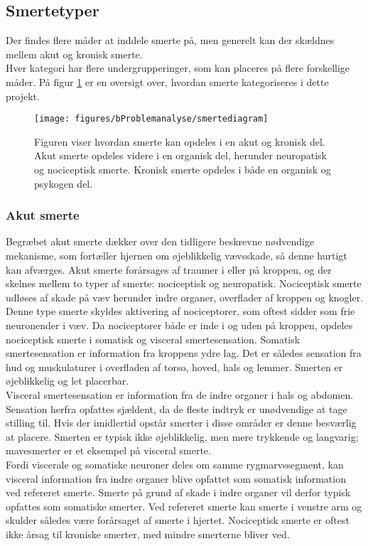 \subsection{Smertetyper}
Der findes flere måder at inddele smerte på, men generelt kan der skældnes mellem akut og kronisk smerte. \\
Hver kategori har flere undergrupperinger, som kan placeres på flere forskellige måder. \citep{Giangregorio1997} På figur \ref{smertediagram} er en oversigt over, hvordan smerte kategoriseres i dette projekt.

\begin{figure}[H]
	\centering
	\texttt{[image: figures/bProblemanalyse/smertediagram]}
	\caption{Figuren viser hvordan smerte kan opdeles i en akut og kronisk del. Akut smerte opdeles videre i en organisk del, herunder neuropatisk og nociceptisk smerte. Kronisk smerte opdeles i både en organisk og psykogen del.}
	\label{smertediagram}
	\flushleft
\end{figure}

\subsubsection{Akut smerte}
Begræbet akut smerte dækker over den tidligere beskrevne nødvendige mekanisme, som fortæller hjernen om øjeblikkelig vævsskade, så denne hurtigt kan afværges. Akut smerte forårsages af traumer i eller på kroppen, og der skelnes mellem to typer af smerte: nociceptisk og neuropatisk. Nociceptisk smerte udløses af skade på væv herunder indre organer, overflader af kroppen og knogler. Denne type smerte skyldes aktivering af nociceptorer, som oftest sidder som frie neuronender i væv. Da nociceptorer både er inde i og uden på kroppen, opdeles nociceptisk smerte i somatisk og visceral smertesensation. Somatisk smertesensation er information fra kroppens ydre lag. Det er således sensation fra hud og muskulaturer i overfladen af torso, hoved, hals og lemmer. \citep{Martini} Smerten er øjeblikkelig og let placerbar. \\
Visceral smertesensation er information fra de indre organer i hals og abdomen. Sensation herfra opfattes sjældent, da de fleste indtryk er unødvendige at tage stilling til. Hvis der imidlertid opstår smerter i disse områder er denne besværlig at placere. Smerten er typisk ikke øjeblikkelig, men mere trykkende og langvarig; mavesmerter er et eksempel på visceral smerte. \citep{Martini} \\
Fordi viscerale og somatiske neuroner deles om samme rygmarvssegment, kan visceral information fra indre organer blive opfattet som somatisk information ved refereret smerte. Smerte på grund af skade i indre organer vil derfor typisk opfattes som somatiske smerter. Ved refereret smerte kan smerte i venstre arm og skulder således være forårsaget af smerte i hjertet. \citep{Martini} Nociceptisk smerte er oftest ikke årsag til kroniske smerter, med mindre smerterne bliver ved.\\ 

